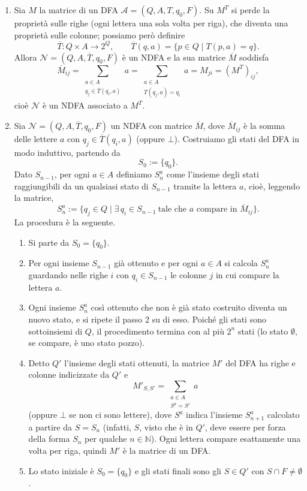 \begin{sol}
\begin{enumerate}
    \item Sia $M$ la matrice di un DFA $\mathcal A=(Q,A,T,q_0,F)$. Su $M^T$ si perde la proprietà sulle righe (ogni lettera una sola volta per riga), che diventa una proprietà sulle colonne; possiamo però definire
    \[
    \overline T\colon Q\times A\to 2^Q,\qquad \overline T(q,a)=\{p\in Q\mid T(p,a)=q\}.
    \]
    Allora $\mathcal N=(Q,A,\overline T,q_0,F)$ è un NDFA e la sua matrice $\overline M$ soddisfa
    \[
    \overline M_{ij}=\sum_{\substack{a\in A\\ q_j\in\overline T(q_i,a)}}a=\sum_{\substack{a\in A\\ T(q_j,a)=q_i}}a=M_{ji}=(M^T)_{ij},
    \]
    cioè $\mathcal N$ è un NDFA associato a $M^T$.
    

    \item Sia $\mathcal N=(Q,A,\overline T,q_0,F)$ un NDFA con matrice $\overline M$, dove $\overline M_{ij}$ è la somma delle lettere $a$ con $q_j\in\overline T(q_i,a)$ (oppure $\bot$). Costruiamo gli stati del DFA in modo induttivo, partendo da
    \[
    S_0:=\{q_0\}.
    \]
    Dato $S_{n-1}$, per ogni $a\in A$ definiamo $S_n^a$ come l'insieme degli stati raggiungibili da un qualsiasi stato di $S_{n-1}$ tramite la lettera $a$, cioè, leggendo la matrice,
    \[
    S_n^a:=\{q_j\in Q\mid \exists\, q_i\in S_{n-1}\ \text{tale che } a \text{ compare in } \overline M_{ij}\}.
    \]
    La procedura è la seguente.
    \ 
    \begin{enumerate}
        \item Si parte da $S_0=\{q_0\}$.
        \item Per ogni insieme $S_{n-1}$ già ottenuto e per ogni $a\in A$ si calcola $S_n^a$ guardando nelle righe $i$ con $q_i\in S_{n-1}$ le colonne $j$ in cui compare la lettera $a$.
        \item Ogni insieme $S_n^a$ così ottenuto che non è già stato costruito diventa un nuovo stato, e si ripete il passo 2 su di esso. Poiché gli stati sono sottoinsiemi di $Q$, il procedimento termina con al più $2^n$ stati (lo stato $\emptyset$, se compare, è uno stato pozzo).
        \item Detto $Q'$ l'insieme degli stati ottenuti, la matrice $M'$ del DFA ha righe e colonne indicizzate da $Q'$ e
        \[
        M'_{S,S'}=\sum_{\substack{a\in A\\ S^a=S'}}a
        \]
        (oppure $\bot$ se non ci sono lettere),
        dove $S^a$ indica l'insieme $S_{n+1}^a$ calcolato a partire da $S=S_{n}$ (infatti, $S$, visto che è in $Q'$, deve essere per forza della forma $S_n$ per qualche $n\in \mathbb N$). 
        Ogni lettera compare esattamente una volta per riga, quindi $M'$ è la matrice di un DFA.
        \item Lo stato iniziale è $S_0=\{q_0\}$ e gli stati finali sono gli $S\in Q'$ con $S\cap F\neq\emptyset$.
    \end{enumerate}


\end{enumerate}
\end{sol}

